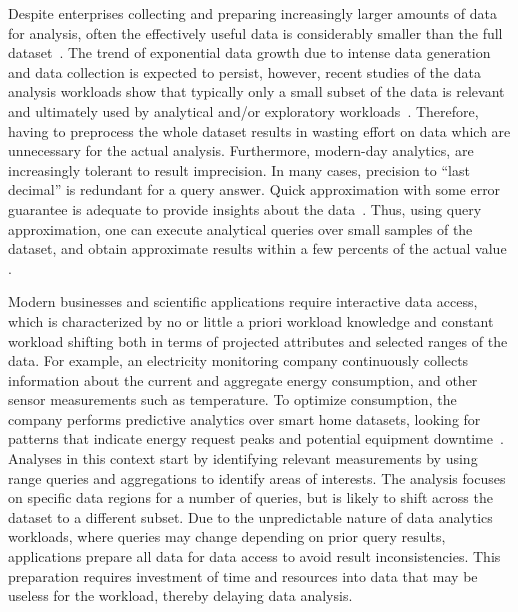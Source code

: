 Despite enterprises collecting and preparing 
increasingly larger amounts of data for analysis, often the effectively useful 
data is considerably smaller than the full 
dataset~\cite{scientific_data,Papadomanolakis2004}. 
The trend of exponential data growth due to intense data generation 
and data collection is expected to persist, however, recent studies 
of the data analysis workloads show that typically only a small 
subset of the data is relevant and ultimately used by analytical 
and/or exploratory workloads~\cite{Chen2012a}. 
Therefore, having to preprocess the whole dataset results in wasting
effort on data which are unnecessary for the actual analysis.
Furthermore, modern-day analytics, are increasingly tolerant to 
result imprecision. In many cases, precision to ``last decimal'' is 
redundant for a query answer. Quick approximation with some error 
guarantee is adequate to provide insights about the 
data~\cite{Cormode2012}.
Thus, using query approximation, one can execute analytical  queries  
over small samples of the dataset, and obtain approximate results 
within a few percents of the actual value \cite{Olma2019}.

Modern businesses and scientific applications require interactive 
data access, which is characterized by no or little a priori workload 
knowledge and constant workload shifting both in terms of projected 
attributes and selected ranges of the data.
For example, an electricity monitoring company continuously collects 
information about the current and aggregate energy consumption, and 
other sensor measurements such as temperature. To optimize 
consumption, the company performs predictive analytics over 
smart home datasets, looking for patterns that indicate energy 
request peaks and potential equipment downtime~\cite{IBM2012}. 
Analyses in this context start by identifying relevant 
measurements by using range queries and aggregations to identify 
areas of interests. The analysis focuses on specific data regions for 
a number of queries, but is likely to shift across the dataset to a 
different subset.
Due to the unpredictable nature of data analytics workloads, where 
queries may change depending on prior query results, applications
prepare all data for data access to avoid result inconsistencies. 
This preparation requires investment of time and resources into data 
that may be useless for the workload, thereby delaying data analysis.

